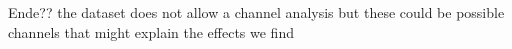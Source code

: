 \documentclass[12pt, a4paper, titlepage]{article}\usepackage[]{graphicx}\usepackage[]{color}
\begin{document}




Ende??
the dataset does not allow a channel analysis but these could be possible channels that might explain the effects we find
\end{document}
